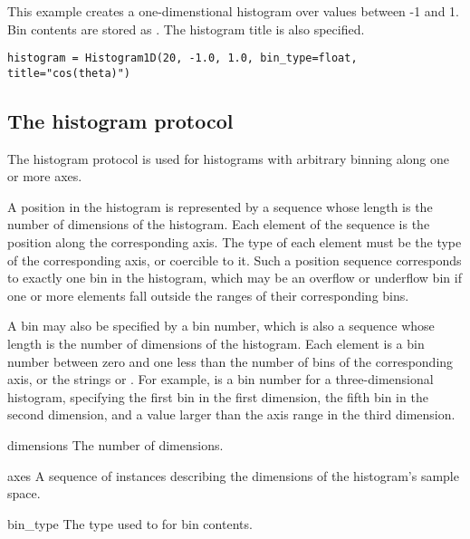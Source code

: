 This example creates a one-dimenstional histogram over 
values between -1 and 1.  Bin contents are stored as .  
The histogram title is also specified.
\begin{verbatim}
histogram = Histogram1D(20, -1.0, 1.0, bin_type=float, title="cos(theta)")
\end{verbatim}


\subsection{The histogram protocol}

The histogram protocol is used for histograms with arbitrary binning
along one or more axes.  

A position in the histogram is represented by a sequence whose length is
the number of dimensions of the histogram.  Each element of the sequence
is the position along the corresponding axis.  The type of each element
must be the type of the corresponding axis, or coercible to it.  Such a
position sequence corresponds to exactly one bin in the histogram, which
may be an overflow or underflow bin if one or more elements fall outside
the ranges of their corresponding bins.

A bin may also be specified by a bin number, which is also a sequence
whose length is the number of dimensions of the histogram.  Each element
is a bin number between zero and one less than the number of bins of the
corresponding axis, or the strings  or
.  For example,  is a bin
number for a three-dimensional histogram, specifying the first bin in
the first dimension, the fifth bin in the second dimension, and a value
larger than the axis range in the third dimension.

\begin{memberdesc}{dimensions}
 \readonly The number of dimensions.
\end{memberdesc}

\begin{memberdesc}{axes}
 \readonly A sequence of  instances describing the
 dimensions of the histogram's sample space.
\end{memberdesc}

\begin{memberdesc}{bin_type}
 \readonly The type used to for bin contents.
\end{memberdesc}

